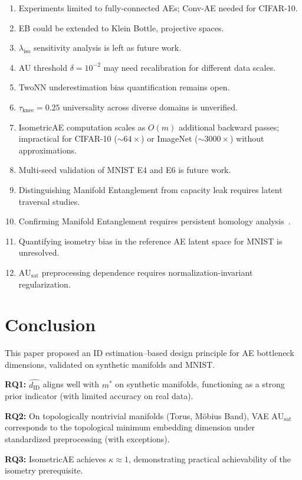\documentclass[12pt,a4paper]{article}
\newcommand{\dID}{d_{\mathrm{ID}}}
\newcommand{\kap}{\kappa}
\newcommand{\AUsat}{\mathrm{AU}_{\mathrm{sat}}}
\begin{document}
\begin{enumerate}
  \item Experiments limited to fully-connected AEs; Conv-AE needed for CIFAR-10.
  \item EB could be extended to Klein Bottle, projective spaces.
  \item $\lambda_\mathrm{iso}$ sensitivity analysis is left as future work.
  \item AU threshold $\delta = 10^{-2}$ may need recalibration for different data scales.
  \item TwoNN underestimation bias quantification remains open.
  \item $\tau_\mathrm{knee} = 0.25$ universality across diverse domains is unverified.
  \item IsometricAE computation scales as $O(m)$ additional backward passes; impractical for CIFAR-10 (${\sim}64\times$) or ImageNet (${\sim}3000\times$) without approximations.
  \item Multi-seed validation of MNIST E4 and E6 is future work.
  \item Distinguishing Manifold Entanglement from capacity leak requires latent traversal studies.
  \item Confirming Manifold Entanglement requires persistent homology analysis~\cite{carlsson2009topology}.
  \item Quantifying isometry bias in the reference AE latent space for MNIST is unresolved.
  \item $\AUsat$ preprocessing dependence requires normalization-invariant regularization.
\end{enumerate}

\section{Conclusion}\label{sec:conclusion}

This paper proposed an ID estimation--based design principle for AE bottleneck dimensions, validated on synthetic manifolds and MNIST.

\textbf{RQ1:} $\hat{\dID}$ aligns well with $m^*$ on synthetic manifolds, functioning as a strong prior indicator (with limited accuracy on real data).

\textbf{RQ2:} On topologically nontrivial manifolds (Torus, M\"{o}bius Band), VAE $\AUsat$ corresponds to the topological minimum embedding dimension under standardized preprocessing (with exceptions).

\textbf{RQ3:} IsometricAE achieves $\kap \approx 1$, demonstrating practical achievability of the isometry prerequisite.
\end{document}
